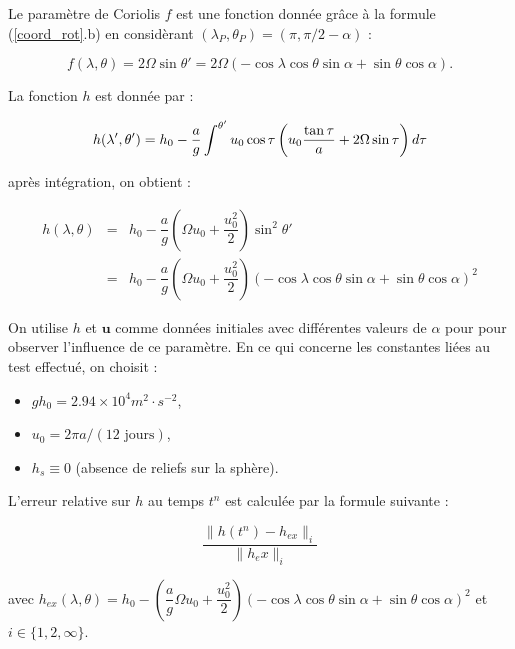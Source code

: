 Le paramètre de Coriolis $f$ est une fonction donnée grâce à la formule (\ref{coord_rot}.b) en considèrant $(\lambda_P, \theta_P) = (\pi, \pi/2 - \alpha)$ :

\begin{equation}
f (\lambda, \theta) = 2 \Omega \sin \theta' = 2 \Omega \left( - \cos \lambda \cos \theta \sin \alpha + \sin \theta \cos \alpha \right).
\end{equation}

La fonction $h$ est donnée par :

\begin{equation}
h(\lambda', \theta') = h_0 - \dfrac{a}{g} \displaystyle\int^{\theta'} u_0 \cos \tau \left( u_0 \dfrac{\tan \tau}{a} + 2 \Omega \sin \tau \right) d \tau
\end{equation}

après intégration, on obtient :

\begin{equation}
\begin{array}{rcl}
h(\lambda, \theta) & = & h_0 - \dfrac{a}{g} \left( \Omega u_0 + \dfrac{u_0^2}{2} \right) \sin^2 \theta' \\
                   & = & h_0 - \dfrac{a}{g} \left( \Omega u_0 + \dfrac{u_0^2}{2} \right) \left( - \cos \lambda \cos \theta \sin \alpha + \sin \theta \cos \alpha \right)^2
\end{array}
\label{eq: williamson 2 initial height}
\end{equation}

On utilise $h$ et $\mathbf{u}$ comme données initiales avec différentes valeurs de $\alpha$ pour pour observer l'influence de ce paramètre. En ce qui concerne les constantes liées au test effectué, on choisit :
\begin{itemize}
\item $g h_0= 2.94 \times 10^4 m^2 \cdot \si{s^{-2}}$,
\item $u_0= 2 \pi a / (12 \text{ jours})$,
\item $h_s \equiv 0$ (absence de reliefs sur la sphère).
\end{itemize}

L'erreur relative sur $h$ au temps $t^n$ est calculée par la formule suivante :

\begin{equation}
\dfrac{\| h(t^n) - h_{ex}\|_i}{\| h_ex \|_i}
\end{equation}

avec $h_{ex}(\lambda, \theta) = h_0 - \left( \dfrac{a}{g} \Omega u_0 + \dfrac{u_0^2}{2} \right) \left( - \cos \lambda \cos \theta \sin \alpha + \sin \theta \cos \alpha \right)^2$ et $i \in \lbrace 1,2,\infty \rbrace$.

